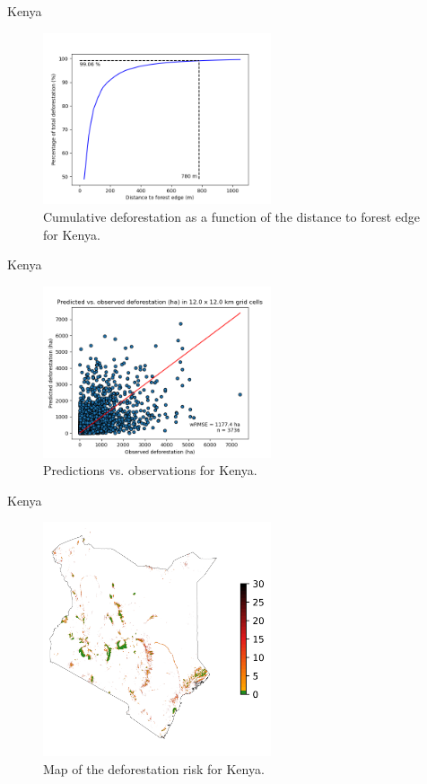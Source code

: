 \documentclass[10pt,table,dvipsnames,compress]{beamer}
\begin{document}
\begin{frame}[label={sec:org37df27d}]{Kenya}
\begin{figure}[htbp]
\centering
\includegraphics[width=0.6\textwidth]{figs/perc_dist_kenya.png}
\caption{Cumulative deforestation as a function of the distance to forest edge for Kenya.}
\end{figure}
\end{frame}

\begin{frame}[label={sec:orgda91c14}]{Kenya}
\begin{figure}[htbp]
\centering
\includegraphics[width=0.6\textwidth]{figs/pred_obs_kenya.png}
\caption{Predictions vs. observations for Kenya.}
\end{figure}
\end{frame}

\begin{frame}[label={sec:org86232ad}]{Kenya}
\begin{figure}[htbp]
\centering
\includegraphics[width=0.6\textwidth]{figs/riskmap_kenya.png}
\caption{Map of the deforestation risk for Kenya.}
\end{figure}
\end{frame}
\end{document}
